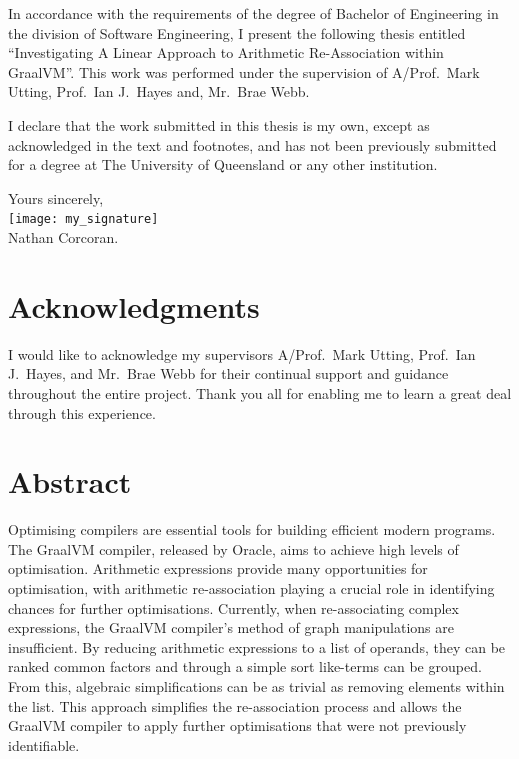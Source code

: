 \documentclass[12pt,openany,a4paper]{book}
\begin{document}
In accordance with the requirements of the degree of Bachelor of
Engineering in the division of 
Software Engineering,
I present the
following thesis entitled ``Investigating A Linear Approach
to Arithmetic Re-Association within GraalVM''.  
This work was performed under the supervision of
A/Prof.\ Mark Utting, Prof.\ Ian J.\ Hayes and, Mr.\ Brae Webb.

I declare that the work submitted in this thesis is my own, except as
acknowledged in the text and footnotes, and has not been previously
submitted for a degree at The University of Queensland or any other
institution.

\begin{flushright}
	Yours sincerely,\\
	\medskip
    \texttt{[image: my\_signature]}\\
	\medskip
	Nathan Corcoran.
\end{flushright}

\cleardoublepage

\chapter{Acknowledgments}

I would like to acknowledge my supervisors A/Prof.\ Mark Utting, Prof.\ Ian J.\
Hayes, and Mr.\ Brae Webb for their continual support and guidance throughout
the entire project. Thank you all for enabling me to learn a great deal through 
this experience.

\cleardoublepage

\chapter{Abstract}

Optimising compilers are essential tools for building efficient modern
programs. The GraalVM compiler, released by Oracle,
aims to achieve high levels of optimisation. Arithmetic expressions provide
many opportunities for optimisation, with arithmetic re-association playing
a crucial role in identifying chances for further optimisations. Currently,
when re-associating complex expressions, the GraalVM compiler's method
of graph manipulations are insufficient. By reducing arithmetic 
expressions to a list of operands, they can be ranked common factors and through
a simple sort like-terms can be grouped. From this, algebraic simplifications can
be as trivial as removing elements within the list. This approach simplifies the re-association
process and allows the GraalVM compiler to apply further optimisations that
were not previously identifiable.
\end{document}
